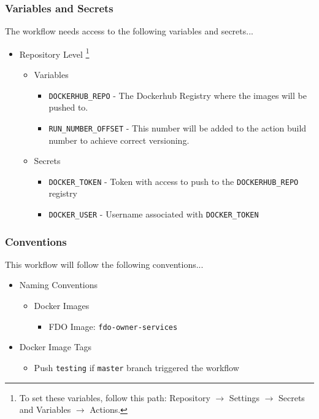 \documentclass[a4paper,11pt]{article}
\begin{document}
\subsubsection{Variables and Secrets}
The workflow needs access to the following variables and secrets...
\begin{itemize}
    \item Repository Level \footnote{To set these variables, follow this path: Repository $\rightarrow$ Settings $\rightarrow$ Secrets and Variables $\rightarrow$ Actions.}
    \begin{itemize}
        \item Variables
        \begin{itemize}
            \item\verb|DOCKERHUB_REPO| - The Dockerhub Registry where the images will be pushed to.
            \item\verb|RUN_NUMBER_OFFSET| - This number will be added to the action build number to achieve correct versioning.
        \end{itemize}
        \item Secrets
        \begin{itemize}
            \item\verb|DOCKER_TOKEN| - Token with access to push to the \verb|DOCKERHUB_REPO| registry
            \item\verb|DOCKER_USER| - Username associated with \verb|DOCKER_TOKEN|
        \end{itemize}
    \end{itemize}
\end{itemize}

\subsubsection{Conventions}
This workflow will follow the following conventions...
\begin{itemize}
    \item Naming Conventions
    \begin{itemize}
        \item Docker Images
        \begin{itemize}
            \item FDO Image: \verb|fdo-owner-services|
        \end{itemize}
    \end{itemize}
    \item{Docker Image Tags}
    \begin{itemize}
        \item Push \verb|testing| if \verb|master| branch triggered the workflow
    \end{itemize}
\end{itemize}
\end{document}
